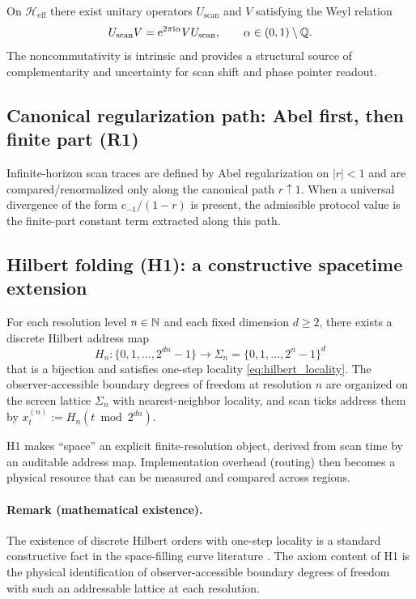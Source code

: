 \begin{axiom}
\label{ax:O6}
On $\mathcal{H}_{\mathrm{eff}}$ there exist unitary operators $U_{\mathrm{scan}}$ and $V$ satisfying the Weyl relation
\[
U_{\mathrm{scan}}V=\mathrm{e}^{2\pi\mathrm{i}\alpha}VU_{\mathrm{scan}},
\qquad \alpha\in(0,1)\setminus\mathbb{Q}.
\]
The noncommutativity is intrinsic and provides a structural source of complementarity and uncertainty for scan shift and phase pointer readout.
\end{axiom}

\subsection{Canonical regularization path: Abel first, then finite part (R1)}
\label{sec:axiom_R1}

\begin{axiom}
\label{ax:R1}
Infinite-horizon scan traces are defined by Abel regularization on $|r|<1$ and are compared/renormalized only along the canonical path $r\uparrow 1$.
When a universal divergence of the form $c_{-1}/(1-r)$ is present, the admissible protocol value is the finite-part constant term extracted along this path.
\end{axiom}

\subsection{Hilbert folding (H1): a constructive spacetime extension}
\label{sec:axiom_H1}

\begin{axiom}
\label{ax:H1}
For each resolution level $n\in\mathbb{N}$ and each fixed dimension $d\ge 2$, there exists a discrete Hilbert address map
\[
H_n:\{0,1,\dots,2^{dn}-1\}\to \Sigma_n=\{0,1,\dots,2^n-1\}^d
\]
that is a bijection and satisfies one-step locality \eqref{eq:hilbert_locality}.
The observer-accessible boundary degrees of freedom at resolution $n$ are organized on the screen lattice $\Sigma_n$ with nearest-neighbor locality, and scan ticks address them by $x_t^{(n)}:=H_n(t\bmod 2^{dn})$.
\end{axiom}

H1 makes ``space'' an explicit finite-resolution object, derived from scan time by an auditable address map.
Implementation overhead (routing) then becomes a physical resource that can be measured and compared across regions.

\paragraph{Remark (mathematical existence).}
The existence of discrete Hilbert orders with one-step locality is a standard constructive fact in the space-filling curve literature \cite{Hilbert1891,Sagan1994}.
The axiom content of H1 is the physical identification of observer-accessible boundary degrees of freedom with such an addressable lattice at each resolution.


